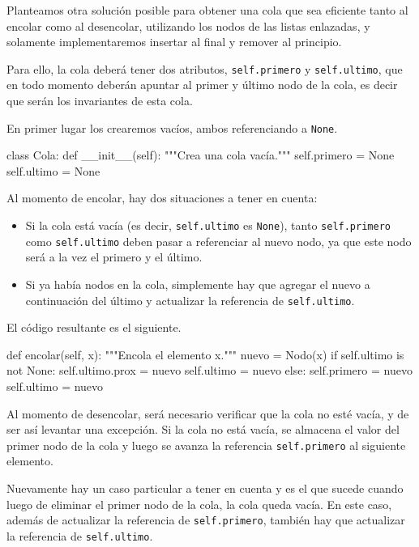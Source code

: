 Planteamos otra solución posible para obtener una cola que sea eficiente tanto al
encolar como al desencolar, utilizando los nodos de las listas enlazadas,
y solamente implementaremos insertar al final y remover al principio.

Para ello, la cola deberá tener dos atributos, \lstinline!self.primero! y
\lstinline!self.ultimo!, que en todo momento deberán apuntar al primer y
último nodo de la cola, es decir que serán los invariantes de esta cola.

En primer lugar los crearemos vacíos, ambos referenciando a
\lstinline!None!.

\begin{codigo-python-sn}
class Cola:
    def __init__(self):
        """Crea una cola vacía."""
        self.primero = None
        self.ultimo = None
\end{codigo-python-sn}

Al momento de encolar, hay dos situaciones a tener en cuenta:
\begin{itemize}

\item Si la cola está vacía (es decir, \lstinline!self.ultimo! es
\lstinline!None!), tanto \lstinline!self.primero! como
\lstinline!self.ultimo! deben pasar a referenciar al nuevo nodo, ya que
este nodo será a la vez el primero y el último.

\item Si ya había nodos en la cola, simplemente hay que agregar el nuevo a
continuación del último y actualizar la referencia de
\lstinline!self.ultimo!.

\end{itemize}

El código resultante es el siguiente.

\begin{codigo-python-sn}
    def encolar(self, x):
        """Encola el elemento x."""
        nuevo = Nodo(x)
        if self.ultimo is not None:
            self.ultimo.prox = nuevo
            self.ultimo = nuevo
        else:
            self.primero = nuevo
            self.ultimo = nuevo
\end{codigo-python-sn}

Al momento de desencolar, será necesario verificar que la cola no esté
vacía, y de ser así levantar una excepción.  Si la cola no está vacía,
se almacena el valor del primer nodo de la cola y luego se avanza la
referencia \lstinline!self.primero! al siguiente elemento.

Nuevamente hay un caso particular a tener en cuenta y es el que sucede
cuando luego de eliminar el primer nodo de la cola, la cola queda vacía.
En este caso, además de actualizar la referencia de
\lstinline!self.primero!, también hay que actualizar la referencia de
\lstinline!self.ultimo!.

